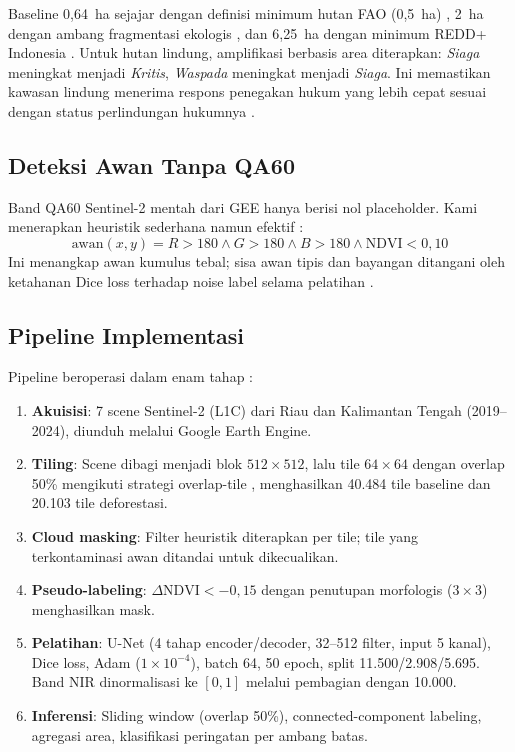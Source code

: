 \documentclass[10pt,a4paper,onecolumn]{article}
\begin{document}
Baseline 0,64~ha sejajar dengan definisi minimum hutan FAO (0,5~ha)
\cite{fao2020fra}, 2~ha dengan ambang fragmentasi ekologis
\cite{renno2016amazon}, dan 6,25~ha dengan minimum REDD+ Indonesia
\cite{gfw2024simontana}.
Untuk hutan lindung, amplifikasi berbasis area diterapkan:
\textit{Siaga} meningkat menjadi \textit{Kritis}, \textit{Waspada}
meningkat menjadi \textit{Siaga}. Ini memastikan kawasan lindung
menerima respons penegakan hukum yang lebih cepat sesuai dengan
status perlindungan hukumnya \cite{ri1999kehutanan}.

\subsection{Deteksi Awan Tanpa QA60}
Band QA60 Sentinel-2 mentah dari GEE hanya berisi nol placeholder.
Kami menerapkan heuristik sederhana namun efektif \cite{zhu2012cloud}:
\[
\text{awan}(x,y) = R{>}180 \land G{>}180 \land B{>}180
\land \text{NDVI}{<}0,10
\]
Ini menangkap awan kumulus tebal; sisa awan tipis dan bayangan
ditangani oleh ketahanan Dice loss terhadap noise label selama
pelatihan \cite{milletari2016vnet}.

\subsection{Pipeline Implementasi}
Pipeline beroperasi dalam enam tahap \cite{kingma2015adam,shapiro2001computer}:
\begin{enumerate}[nosep,itemsep=1pt]
    \item \textbf{Akuisisi}: 7 scene Sentinel-2 (L1C) dari Riau dan
          Kalimantan Tengah (2019--2024), diunduh melalui Google
          Earth Engine.
    \item \textbf{Tiling}: Scene dibagi menjadi blok $512\times512$,
          lalu tile $64\times64$ dengan overlap 50\% mengikuti
          strategi overlap-tile \cite{ronneberger2015unet}, menghasilkan
          40.484 tile baseline dan 20.103 tile deforestasi.
    \item \textbf{Cloud masking}: Filter heuristik diterapkan per
          tile; tile yang terkontaminasi awan ditandai untuk
          dikecualikan.
    \item \textbf{Pseudo-labeling}: $\Delta\text{NDVI}<-0,15$ dengan
          penutupan morfologis ($3\times3$) menghasilkan mask.
    \item \textbf{Pelatihan}: U-Net (4 tahap encoder/decoder,
          32--512 filter, input 5 kanal), Dice loss, Adam
          ($1\times10^{-4}$), batch 64, 50 epoch, split
          11.500/2.908/5.695. Band NIR dinormalisasi ke $[0,1]$
          melalui pembagian dengan 10.000.
    \item \textbf{Inferensi}: Sliding window (overlap 50\%),
          connected-component labeling, agregasi area, klasifikasi
          peringatan per ambang batas.
\end{enumerate}
\end{document}
